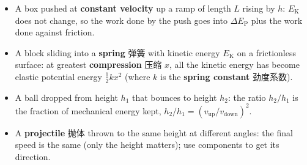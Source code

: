 \documentclass[11pt]{article}
\begin{document}
\begin{itemize}
\item A box pushed at \textbf{constant velocity} up a ramp of length $L$ rising by $h$: $E_{\text{K}}$ does not change, so the work done by the push goes into $\Delta E_{\text{P}}$ plus the work done against friction.

\item A block sliding into a \textbf{spring} 弹簧 with kinetic energy $E_{\text{K}}$ on a frictionless surface: at greatest \textbf{compression} 压缩 $x$, all the kinetic energy has become elastic potential energy $\tfrac{1}{2} k x^{2}$ (where $k$ is the \textbf{spring constant} 劲度系数).

\item A ball dropped from height $h_{1}$ that bounces to height $h_{2}$: the ratio $h_{2}/h_{1}$ is the fraction of mechanical energy kept, $h_{2}/h_{1} = (v_{\text{up}}/v_{\text{down}})^{2}$.

\item A \textbf{projectile} 抛体 thrown to the same height at different angles: the final speed is the same (only the height matters); use components to get its direction.

\end{itemize}
\end{document}
